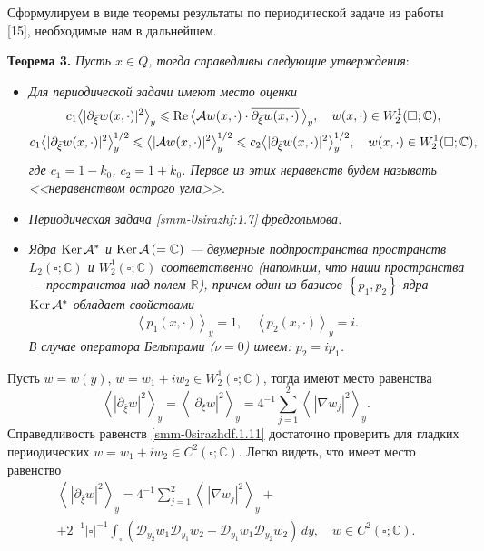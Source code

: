 \documentclass[a4paper,12pt]{article}
\theoremstyle{definition}
\begin{document}
Сформулируем в виде теоремы результаты по периодической задаче из работы [15], необходимые нам в дальнейшем.


\smallskip
\textbf{Теорема 3.} {\it Пусть $x\in\overline Q$, тогда справедливы следующие утверждения}:
\begin{itemize}
	\item  {\it Для периодической задачи имеют место оценки}
	\begin{gather}\label{smm-0sirazhf:1.9}
		c_1\big<|\partial_{\bar{\xi}}w(x,\cdot)|^2\big>_y\leqslant \text{\rm Re\,}\big<\mathcal{A}w(x,\cdot)\cdot \overline{\partial_{\bar{\xi}}w(x,\cdot)}\,\big>_y,\quad  w(x,\cdot)\in W_2^1(\square;\mathbb{C}),\\
		c_1\big<|\partial_{\bar{\xi}}w(x,\cdot)|^2\big>_y^{1/2}\leqslant
		\big<|\mathcal{A}w(x,\cdot)|^2\big>_y^{1/2}\leqslant c_2\big<|\partial_{\bar{\xi}}w(x,\cdot)|^2\big>_y^{1/2},\quad  w(x,\cdot)\in W_2^1(\square;\mathbb{C}),\label{smm-0sirazhf:1.9'}
	\end{gather}
	{\it где $c_1=1-k_0$, $c_2=1+k_0$. Первое из этих неравенств будем называть <<неравенством острого угла>>}.
	\item {\it Периодическая задача \eqref{smm-0sirazhf:1.7} фредгольмова.}
	\item \textit{Ядра  $\text{\rm Ker\,}\mathcal{A}^\ast$ и $\text{\rm Ker\,}\mathcal{A}\,(=\mathbb{C})$
		--- двумерные подпространства пространств $L_2(\square;\mathbb{C})$ и $W_2^1(\square;\mathbb{C})$ соответственно {\rm(}напомним, что
		наши пространства --- пространства над полем $\mathbb{R}${\rm)},
		причем один из базисов $\left\{p_1,p_2\right\}$ ядра
		$\text{\rm Ker\,}\mathcal{A}^\ast$ обладает свойствами
		\begin{equation}\label{smm-0sirazhdf:1.10}
			\left< p_1(x,\cdot)\right>_y=1,\quad \left< p_2(x,\cdot)\right>_y=i.
		\end{equation}
		В случае оператора Бельтрами {\rm(}$\nu=0${\rm)} имеем: $p_2=ip_1$.}
\end{itemize}
Пусть $w=w(y)$, $w=w_1+iw_2\in W_2^1(\square;\mathbb{C})$, тогда имеют место равенства
\begin{equation}\label{smm-0sirazhdf.1.11}
	\left<|\partial_{\bar{\xi}}w|^2\right>_y=\left<|\partial_{\xi}w|^2\right>_y=4^{-1}\sum_{j=1}^2\left<
	\,|\nabla w_j|^2\right>_y.
\end{equation}
Справедливость равенств \eqref{smm-0sirazhdf.1.11} достаточно проверить  для  гладких периодических $w=w_1+iw_2\in C^2(\square;\mathbb{C})$. Легко видеть, что имеет место равенство
\begin{equation}\label{smm-0sirazhdf.1.111}
	\begin{gathered}
		\left<\,|\partial_{\bar \xi} w|^2\right>_y=4^{-1}\sum_{j=1}^2\left<
		\,|\nabla w_j|^2\right>_y+\\
		+2^{-1}|\square|^{-1}\int_{\square}\left(\mathscr{D}_{y_2}w_1\mathscr{D}_{y_1}w_2-\mathscr{D}_{y_1}w_1\mathscr{D}_{y_2}w_2\right)\,dy,\quad w\in C^2(\square;\mathbb{C}).
	\end{gathered}
\end{equation}
\end{document}
